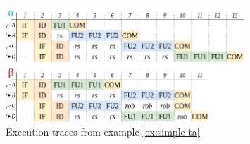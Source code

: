 \begin{figure}[htbp]
    \centering
    \includegraphics[width=0.8\textwidth]{figures/multiscalar_ta.png}
    \caption{Execution traces from example \ref{ex:simple-ta}}
    \label{fig:multiscalar-ta}
\end{figure}



